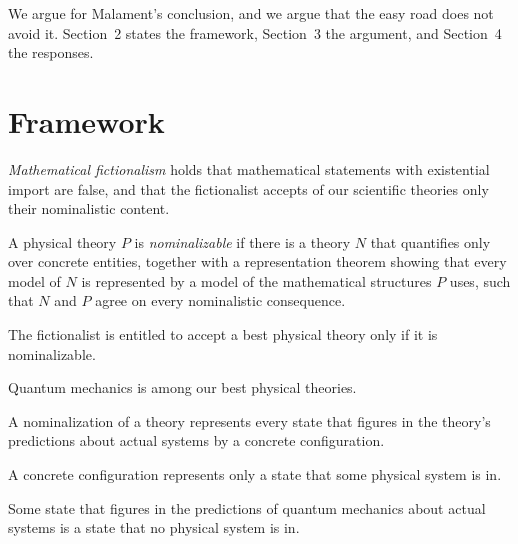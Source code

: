 \documentclass{situationist-preprint}
\begin{document}
We argue for Malament's conclusion, and we argue that the easy road does not avoid it. Section~2 states the framework, Section~3 the argument, and Section~4 the responses.

\section{Framework}

\begin{definition}[Fictionalism]\label{d:fict}
\emph{Mathematical fictionalism} holds that mathematical statements with existential import are false, and that the fictionalist accepts of our scientific theories only their nominalistic content.
\end{definition}

\begin{definition}[Nominalization]\label{d:nom}
A physical theory $P$ is \emph{nominalizable} if there is a theory $N$ that quantifies only over concrete entities, together with a representation theorem showing that every model of $N$ is represented by a model of the mathematical structures $P$ uses, such that $N$ and $P$ agree on every nominalistic consequence.
\end{definition}

\begin{assumption}[Entitlement]\label{a:ent}
The fictionalist is entitled to accept a best physical theory only if it is nominalizable.
\end{assumption}

\begin{assumption}\label{a:best}
Quantum mechanics is among our best physical theories.
\end{assumption}

\begin{assumption}[Representation]\label{a:rep}
A nominalization of a theory represents every state that figures in the theory's predictions about actual systems by a concrete configuration.
\end{assumption}

\begin{assumption}[Actuality]\label{a:act}
A concrete configuration represents only a state that some physical system is in.
\end{assumption}

\begin{assumption}\label{a:uninst}
Some state that figures in the predictions of quantum mechanics about actual systems is a state that no physical system is in.
\end{assumption}
\end{document}
